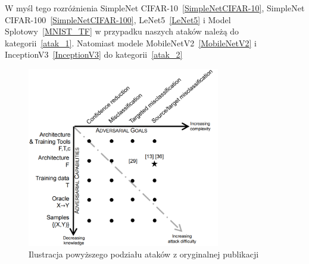 \documentclass[
    left=2.5cm,         %
    right=2.5cm,        %
    top=2.5cm,          %
    bottom=3cm,         %
    bindingoffset=6mm,  %
    nohyphenation=false %
]{eiti/eiti-thesis}
\begin{document}
W myśl tego rozróżnienia SimpleNet CIFAR-10~\ref{SimpleNetCIFAR-10}, SimpleNet CIFAR-100~\ref{SimpleNetCIFAR-100},
LeNet5~\ref{LeNet5} i Model Splotowy~\ref{MNIST_TF} w przypadku naszych ataków należą do kategorii~\ref{atak_1}.
Natomiast modele MobileNetV2~\ref{MobileNetV2} i InceptionV3~\ref{InceptionV3} do kategorii~\ref{atak_2}

\begin{figure}[H]
    \begin{center}
        \includegraphics[width=0.75\textwidth]{eiti/attacks_taxonomy.png}
    \end{center}
    \caption{Ilustracja powyższego podziału ataków z oryginalnej publikacji~\cite{DBLP:journals/corr/PapernotMJFCS15}}
\end{figure}

\newpage
\end{document}
